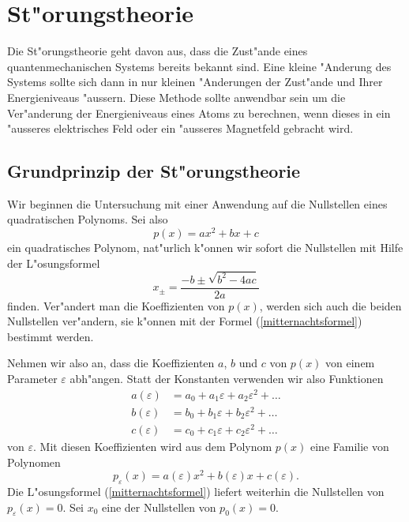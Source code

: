 \chapter{St"orungstheorie}
\rhead{}
Die St"orungstheorie geht davon aus, dass die Zust"ande eines
quantenmechanischen Systems bereits bekannt sind. Eine kleine
"Anderung des Systems sollte sich dann in nur kleinen "Anderungen
der Zust"ande und Ihrer Energieniveaus "aussern.
Diese Methode sollte anwendbar sein um die Ver"anderung der Energieniveaus
eines Atoms zu berechnen, wenn dieses in ein "ausseres elektrisches Feld
oder ein "ausseres Magnetfeld gebracht wird.


\section{Grundprinzip der St"orungstheorie}
Wir beginnen die Untersuchung mit einer Anwendung auf die Nullstellen
eines quadratischen Polynoms. Sei also
\[
p(x) = ax^2 + bx + c
\]
ein quadratisches Polynom, nat"urlich k"onnen wir sofort die Nullstellen
mit Hilfe der L"osungsformel
\begin{equation}
x_{\pm}=\frac{-b\pm\sqrt{b^2-4ac}}{2a}
\label{mitternachtsformel}
\end{equation}
finden.  Ver"andert man die Koeffizienten von $p(x)$, werden sich auch
die beiden Nullstellen ver"andern, sie k"onnen mit der Formel
(\ref{mitternachtsformel}) bestimmt werden.

Nehmen wir also an, dass die Koeffizienten $a$, $b$ und $c$ von $p(x)$
von einem Parameter $\varepsilon$ abh"angen. Statt der Konstanten verwenden
wir also Funktionen
\begin{align*}
a(\varepsilon)&=a_0+a_1\varepsilon+a_2\varepsilon^2+\dots\\
b(\varepsilon)&=b_0+b_1\varepsilon+b_2\varepsilon^2+\dots\\
c(\varepsilon)&=c_0+c_1\varepsilon+c_2\varepsilon^2+\dots
\end{align*}
von $\varepsilon$. Mit diesen Koeffizienten wird aus dem Polynom $p(x)$
eine Familie von Polynomen
\[
p_\varepsilon(x)=a(\varepsilon)x^2 + b(\varepsilon)x+c(\varepsilon).
\]
Die L"osungsformel (\ref{mitternachtsformel}) liefert weiterhin die
Nullstellen von $p_{\varepsilon}(x)=0$.
Sei $x_0$ eine der Nullstellen von $p_0(x) = 0$.

